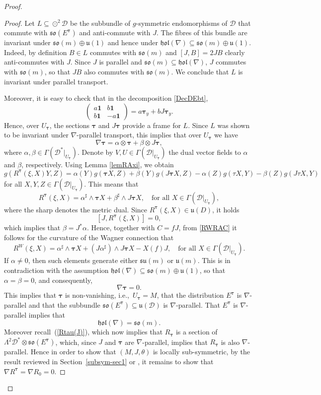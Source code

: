 \documentclass{amsart}
\theoremstyle{plain}
\theoremstyle{definition}
\def\so{\mathfrak{so}}
\def\su{\mathfrak{su}}
\def\u{\mathfrak{u}}
\newcommand{\hol}{\mathfrak{hol}}
\newcommand{\bt}{{\boldsymbol{\tau}}}
\newcommand{\1}{\mathbf{1}}
\newcommand{\D}{{\mathcal D}}
\newcommand{\E}{{E}}
\renewcommand{\d}{\mathrm{d}}
\newcommand{\+}{\oplus}
\begin{document}
\begin{proof}
\begin{proof}
Let $L\subseteq \odot^2\D$ be the subbundle of $g$-symmetric endomorphisms of $\D$ that commute with $\so(\E^\bt)$ and anti-commute with $J$. 
The fibres of this bundle are invariant under $\so(m)\+\u(1)$ and hence under $\hol(\nabla)\subseteq \so(m)\+\u(1)$. Indeed, by definition $B\in L$ commutes with $\so(m)$ and $[J,B]=2JB$ clearly anti-commutes with $J$. Since $J$ is parallel and $\so(m)\subseteq \hol(\nabla)$, $J$ commutes with $\so(m)$, so that $JB$ also commutes with $\so(m)$. We conclude that $L$ is invariant under parallel transport.

Moreover, it is easy to check that in the decomposition \eqref{DecDEbt}, 
$$\left( \begin{matrix} a\1& b\1\\b\1 &-a\1\end{matrix}\right)=a\bt_y+bJ\bt_y.$$
Hence, over $U_\bt$, the sections $\bt$ and 
$J\bt$ provide a frame for $L$. Since $L$ was shown to be invariant under $\nabla$-parallel transport, this implies that over $U_\bt$ we have 
$$\nabla \bt=\alpha\otimes \bt+\beta\otimes J\bt,$$
where $\alpha,\beta\in \Gamma(\D^*|_{U_\bt})$. Denote by $V,U\in\Gamma(\D|_{U_\bt})$ the dual vector fields to $\alpha$ and $\beta$, respectively. 
Using Lemma \ref{lemRAxi}, we obtain
\[g(R^\bt(\xi,X)Y,Z)=\alpha(Y)g(\bt X,Z)+\beta(Y)g(J\bt X,Z)-\alpha(Z)g(\tau X,Y)-\beta(Z)g(J\tau X,Y)\]
for all $X,Y,Z\in\Gamma(\D|_{U_\bt})$.
This means that
$$R^\bt(\xi,X)=\alpha^\sharp\wedge \bt X+\beta^\sharp \wedge J\bt X,\quad\text{for all } X\in\Gamma(\D|_{U_\bt}),$$
where the sharp denotes the metric dual.
Since $R^\bt(\xi,X)\in\u(D)$, it holds 
$$[J,R^\bt(\xi,X)]=0,$$ which implies that $\beta=J^*\alpha$. Hence, together with $C=fJ$, from \eqref{RWRAC} it follows for the curvature of the Wagner connection that
\begin{equation}
\label{RWRWTtau1}
R^{W}(\xi,X)=\alpha^\sharp \wedge \bt X+(J\alpha^\sharp)\wedge J\bt X-X(f)J,\quad\text{for all } X\in\Gamma(\D|_{U_\bt}).\end{equation}
If $\alpha \neq 0$, then such elements generate either $\su(m)$ or $\u(m)$. This is in contradiction with the assumption $\hol(\nabla)\subseteq\so(m)\oplus\u(1)$, so that 
$\alpha=\beta=0$, and consequently,
$$\nabla\bt=0.$$ 
This implies that $\bt$ is non-vanishing, i.e.,~$U_\bt=M$,  that 
the distribution $E^\bt$ is $\nabla$-parallel and that the subbundle $\so(E^\bt)\subseteq\u(\D)$ is $\nabla$-parallel. That $E^\bt$ is $\nabla$-parallel implies that 
$$\hol(\nabla)=\so(m).$$  
Moreover recall~(\ref{Rtau(J)}), which now implies that  $R_\bt$ is a section of $\Lambda^2\D^*\otimes \so(E^\bt)$, which, since $J$ and $\bt$ are $\nabla$-parallel, 
implies that $R_\bt$ is also $\nabla$-parallel. 
Hence in order to show that $(M,J,\theta)$ is locally sub-symmetric, by the result reviewed in Section~\ref{subsym-sec1} or \cite[Theorem~2.1]{FG}, it remains to show that $\nabla R^\bt=\nabla R_0=0$.


\end{proof}
\end{proof}
\end{document}
